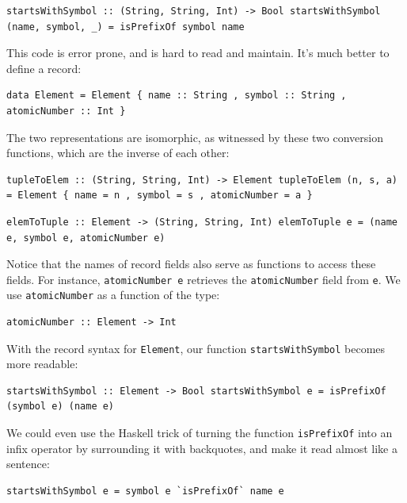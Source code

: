 \begin{verbatim}
startsWithSymbol :: (String, String, Int) -> Bool startsWithSymbol (name, symbol, _) = isPrefixOf symbol name
\end{verbatim}

This code is error prone, and is hard to read and maintain. It's much
better to define a record:

\begin{verbatim}
data Element = Element { name :: String , symbol :: String , atomicNumber :: Int }
\end{verbatim}

The two representations are isomorphic, as witnessed by these two
conversion functions, which are the inverse of each other:

\begin{verbatim}
tupleToElem :: (String, String, Int) -> Element tupleToElem (n, s, a) = Element { name = n , symbol = s , atomicNumber = a }
\end{verbatim}

\begin{verbatim}
elemToTuple :: Element -> (String, String, Int) elemToTuple e = (name e, symbol e, atomicNumber e)
\end{verbatim}

Notice that the names of record fields also serve as functions to access
these fields. For instance, \texttt{atomicNumber\ e} retrieves the
\texttt{atomicNumber} field from \texttt{e}. We use
\texttt{atomicNumber} as a function of the type:

\begin{verbatim}
atomicNumber :: Element -> Int
\end{verbatim}

With the record syntax for \texttt{Element}, our function
\texttt{startsWithSymbol} becomes more readable:

\begin{verbatim}
startsWithSymbol :: Element -> Bool startsWithSymbol e = isPrefixOf (symbol e) (name e)
\end{verbatim}

We could even use the Haskell trick of turning the function
\texttt{isPrefixOf} into an infix operator by surrounding it with
backquotes, and make it read almost like a sentence:

\begin{verbatim}
startsWithSymbol e = symbol e `isPrefixOf` name e
\end{verbatim}


